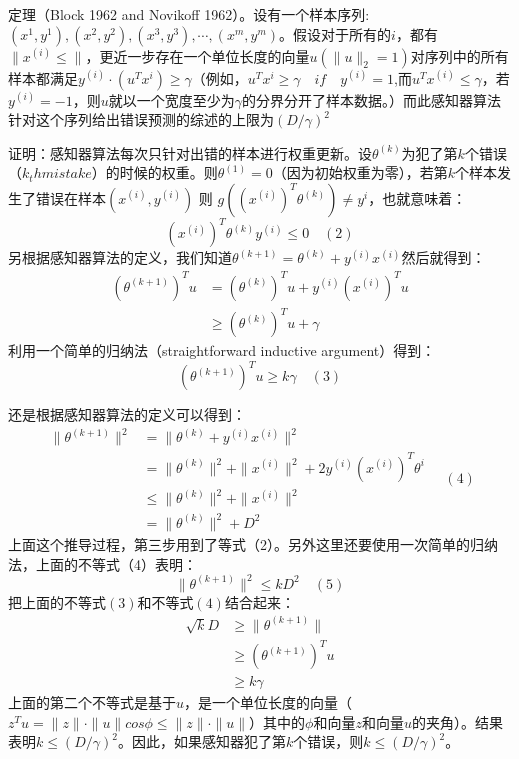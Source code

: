 \documentclass[14pt,a4paper]{article}
\begin{document}
\begin{spacing}{1.25}
定理（Block 1962 and Novikoff 1962）。设有一个样本序列:$(x^1,y^1),(x^2,y^2),(x^3,y^3),\cdots,(x^m,y^m)$。假设对于所有的$i$，都有$\parallel x^{(i)}\leq\parallel$，更近一步存在一个单位长度的向量$u(\parallel u\parallel_2=1)$对序列中的所有样本都满足$y^{(i)}\cdot(u^{T}x^{i})\ge \gamma$（例如，$u^{T}x^{i}\ge \gamma \quad if\quad y^{(i)}=1$,而$u^{T}x^{(i)}\leq \gamma$，若$y^{(i)}=-1$，则$u$就以一个宽度至少为$\gamma$的分界分开了样本数据。）而此感知器算法针对这个序列给出错误预测的综述的上限为$(D/\gamma)^2$

证明：感知器算法每次只针对出错的样本进行权重更新。设$\theta^{(k)}$为犯了第$k$个错误（$k_th mistake$）的时候的权重。则$ \theta^{(1)}=0 $（因为初始权重为零），若第$k$个样本发生了错误在样本$(x^{(i)},y^{(i)})$ 则 $ g((x^{(i)})^{T}\theta^{(k)})\neq y^{i}$，也就意味着：
$$(x^{(i)})^{T}\theta^{(k)}y^{(i)}\leq 0\quad(2)$$
另根据感知器算法的定义，我们知道$\theta^{(k+1)}=\theta^{(k)}+y^{(i)}x^{(i)}$然后就得到：
$$
\begin{aligned}
(\theta^{(k+1)})^{T}u&=(\theta^{(k)})^{T}u+y^{(i)}(x^{(i)})^{T}u \\ 
&\ge (\theta^{(k)})^{T}u+\gamma
\end{aligned}
$$
利用一个简单的归纳法（straightforward inductive argument）得到：
$$(\theta^{(k+1)})^{T}u\ge k \gamma \quad(3)$$


还是根据感知器算法的定义可以得到：
$$
\begin{aligned}
\parallel\theta^{(k+1)}\parallel^2&=\parallel\theta^{(k)}+y^{(i)}x^{(i)}\parallel^2\\
&=\parallel\theta^{(k)}\parallel^2+\parallel x^{(i)}\parallel^2+2y^{(i)}(x^{(i)})^{T}\theta^{i}\\
&\leq \parallel\theta^{(k)}\parallel^2+\parallel x^{(i)}\parallel^2\\
&=\parallel \theta^{(k)}\parallel^2+D^2
\end{aligned}\quad(4)
$$
上面这个推导过程，第三步用到了等式（2）。另外这里还要使用一次简单的归纳法，上面的不等式（4）表明：
$$
\parallel\theta^{(k+1)}\parallel^2\leq kD^2 \quad(5)
$$
把上面的不等式$(3)$和不等式$(4)$结合起来：
$$
\begin{aligned}
\sqrt{k}D&\ge \parallel\theta^{(k+1)}\parallel\\
         &\ge (\theta^{(k+1)})^{T}u\\
         &\ge k\gamma
\end{aligned}$$
上面的第二个不等式是基于$u$，是一个单位长度的向量（$z^{T}u=\parallel z\parallel \cdot \parallel u\parallel cos\phi\leq\parallel z\parallel \cdot \parallel u\parallel $）其中的$\phi$和向量$z$和向量$u$的夹角）。结果表明$k\leq(D/\gamma)^2$。因此，如果感知器犯了第$k$个错误，则$k\leq(D/\gamma)^2$。
\end{spacing}
\end{document}
